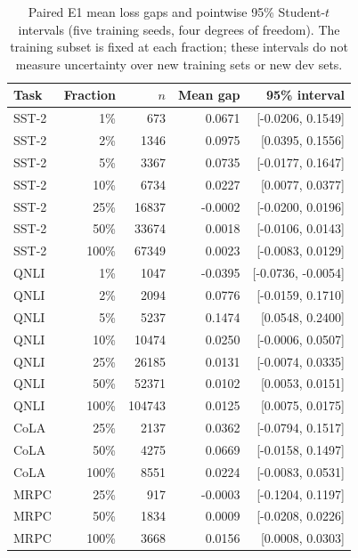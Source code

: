 \begin{table}[t]
\centering\small
\caption{Paired E1 mean loss gaps and pointwise 95\% Student-$t$ intervals (five training seeds, four degrees of freedom). The training subset is fixed at each fraction; these intervals do not measure uncertainty over new training sets or new dev sets.}
\label{tab:e1_paired_ci}
\begin{tabular}{lrrrr}
\toprule
Task & Fraction & $n$ & Mean gap & 95\% interval \\
\midrule
SST-2 & 1\% & 673 & 0.0671 & [-0.0206, 0.1549] \\
SST-2 & 2\% & 1346 & 0.0975 & [0.0395, 0.1556] \\
SST-2 & 5\% & 3367 & 0.0735 & [-0.0177, 0.1647] \\
SST-2 & 10\% & 6734 & 0.0227 & [0.0077, 0.0377] \\
SST-2 & 25\% & 16837 & -0.0002 & [-0.0200, 0.0196] \\
SST-2 & 50\% & 33674 & 0.0018 & [-0.0106, 0.0143] \\
SST-2 & 100\% & 67349 & 0.0023 & [-0.0083, 0.0129] \\
QNLI & 1\% & 1047 & -0.0395 & [-0.0736, -0.0054] \\
QNLI & 2\% & 2094 & 0.0776 & [-0.0159, 0.1710] \\
QNLI & 5\% & 5237 & 0.1474 & [0.0548, 0.2400] \\
QNLI & 10\% & 10474 & 0.0250 & [-0.0006, 0.0507] \\
QNLI & 25\% & 26185 & 0.0131 & [-0.0074, 0.0335] \\
QNLI & 50\% & 52371 & 0.0102 & [0.0053, 0.0151] \\
QNLI & 100\% & 104743 & 0.0125 & [0.0075, 0.0175] \\
CoLA & 25\% & 2137 & 0.0362 & [-0.0794, 0.1517] \\
CoLA & 50\% & 4275 & 0.0669 & [-0.0158, 0.1497] \\
CoLA & 100\% & 8551 & 0.0224 & [-0.0083, 0.0531] \\
MRPC & 25\% & 917 & -0.0003 & [-0.1204, 0.1197] \\
MRPC & 50\% & 1834 & 0.0009 & [-0.0208, 0.0226] \\
MRPC & 100\% & 3668 & 0.0156 & [0.0008, 0.0303] \\
\bottomrule
\end{tabular}
\end{table}
